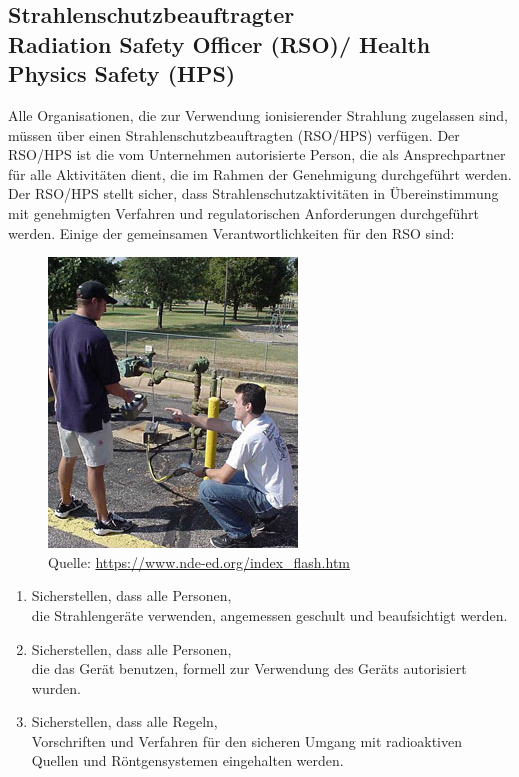 {\subsection{Strahlenschutzbeauftragter \\ Radiation Safety Officer (RSO)/ Health Physics Safety (HPS)}
\label{sec:strahlenschutzbeauftragter}

Alle Organisationen, die zur Verwendung ionisierender Strahlung zugelassen sind, müssen über einen Strahlenschutzbeauftragten (RSO/HPS) verfügen. Der RSO/HPS ist die vom Unternehmen autorisierte Person, die als Ansprechpartner für alle Aktivitäten dient, die im Rahmen der Genehmigung durchgeführt werden. Der RSO/HPS stellt sicher, dass Strahlenschutzaktivitäten in Übereinstimmung mit genehmigten Verfahren und regulatorischen Anforderungen durchgeführt werden. Einige der gemeinsamen Verantwortlichkeiten für den RSO sind:\\
\begin{figure}
\includegraphics[scale=0.7]{img/rso.jpg}\\
Quelle: \url{https://www.nde-ed.org/index_flash.htm}
\end{figure}
\begin{enumerate}
  \item Sicherstellen, dass alle Personen, \\die Strahlengeräte verwenden, angemessen geschult     und beaufsichtigt werden.
  \item Sicherstellen, dass alle Personen, \\die das Gerät benutzen, formell zur Verwendung des Geräts autorisiert wurden.
  \item Sicherstellen, dass alle Regeln, \\Vorschriften und Verfahren für den sicheren Umgang mit  radioaktiven Quellen und Röntgensystemen eingehalten werden.

\end{enumerate}}

